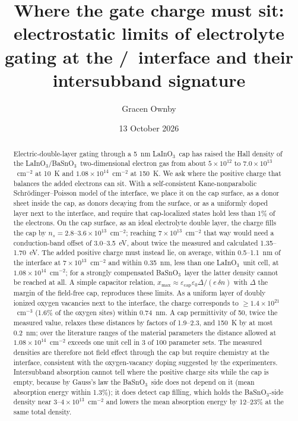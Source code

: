 \documentclass[11pt]{article}
\title{Where the gate charge must sit: electrostatic limits of electrolyte gating at the \LIO/\BSO\ interface and their intersubband signature}
\author{Gracen Ownby}
\affil{University of Oklahoma, Norman, Oklahoma, USA}
\date{\small 13 October 2026}
\newcommand{\LIO}{\texorpdfstring{LaInO$_3$}{LaInO3}}
\newcommand{\BSO}{\texorpdfstring{BaSnO$_3$}{BaSnO3}}
\newcommand{\xmax}{x_\mathrm{max}}
\begin{document}
\maketitle

\begin{abstract}
Electric-double-layer gating through a 5~nm \LIO\ cap has raised the Hall density of the \LIO/\BSO\ two-dimensional electron gas from about $5\times10^{12}$ to $7.0\times10^{13}$~cm$^{-2}$ at 10~K and $1.08\times10^{14}$~cm$^{-2}$ at 150~K. We ask where the positive charge that balances the added electrons can sit. With a self-consistent Kane-nonparabolic Schr\"odinger--Poisson model of the interface, we place it on the cap surface, as a donor sheet inside the cap, as donors decaying from the surface, or as a uniformly doped layer next to the interface, and require that cap-localized states hold less than 1\% of the electrons. On the cap surface, as an ideal electrolyte double layer, the charge fills the cap by $n_s=2.8$--$3.6\times10^{13}$~cm$^{-2}$; reaching $7\times10^{13}$~cm$^{-2}$ that way would need a conduction-band offset of 3.0--3.5~eV, about twice the measured and calculated 1.35--1.70~eV. The added positive charge must instead lie, on average, within 0.5--1.1~nm of the interface at $7\times10^{13}$~cm$^{-2}$ and within 0.35~nm, less than one \LIO\ unit cell, at $1.08\times10^{14}$~cm$^{-2}$; for a strongly compensated \BSO\ layer the latter density cannot be reached at all. A simple capacitor relation, $\xmax\approx\varepsilon_\mathrm{cap}\varepsilon_0\Delta/(e\,\delta n)$ with $\Delta$ the margin of the field-free cap, reproduces these limits. As a uniform layer of doubly ionized oxygen vacancies next to the interface, the charge corresponds to $\ge1.4\times10^{21}$~cm$^{-3}$ (1.6\% of the oxygen sites) within 0.74~nm. A cap permittivity of 50, twice the measured value, relaxes these distances by factors of 1.9--2.3, and 150~K by at most 0.2~nm; over the literature ranges of the material parameters the distance allowed at $1.08\times10^{14}$~cm$^{-2}$ exceeds one unit cell in 3 of 100 parameter sets. The measured densities are therefore not field effect through the cap but require chemistry at the interface, consistent with the oxygen-vacancy doping suggested by the experimenters. Intersubband absorption cannot tell where the positive charge sits while the cap is empty, because by Gauss's law the \BSO\ side does not depend on it (mean absorption energy within 1.3\%); it does detect cap filling, which holds the \BSO-side density near $3$--$4\times10^{13}$~cm$^{-2}$ and lowers the mean absorption energy by 12--23\% at the same total density.
\end{abstract}
\end{document}
